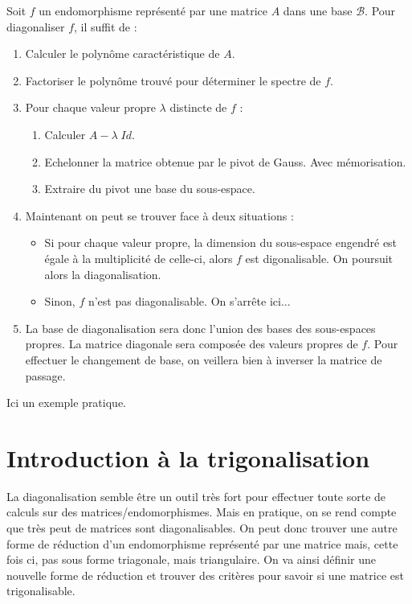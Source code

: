 Soit $f$ un endomorphisme représenté par une matrice $A$ dans une base $\mathcal{B}$. 
Pour diagonaliser $f$, il suffit de :
\begin{enumerate}
    \item Calculer le polynôme caractéristique de $A$. 
    \item Factoriser le polynôme trouvé pour déterminer le spectre de $f$. 
    \item Pour chaque valeur propre $\lambda$ distincte de $f$ :
        \begin{enumerate}
            \item Calculer $A - \lambda \; Id$. 
            \item Echelonner la matrice obtenue par le pivot de Gauss. Avec mémorisation. 
            \item Extraire du pivot une base du sous-espace. 
        \end{enumerate}
    \item Maintenant on peut se trouver face à deux situations :
        \begin{itemize}
            \item Si pour chaque valeur propre, la dimension du sous-espace engendré est égale à la multiplicité de 
                celle-ci, alors $f$ est digonalisable. On poursuit alors la diagonalisation. 
            \item Sinon, $f$ n'est pas diagonalisable. On s'arrête ici... 
        \end{itemize}
    \item La base de diagonalisation sera donc l'union des bases des sous-espaces propres. 
            La matrice diagonale sera composée des valeurs propres de $f$. 
            Pour effectuer le changement de base, on veillera bien à inverser la matrice de passage. 
\end{enumerate}

\begin{example}
    Ici un exemple pratique. 
\end{example}

\section{Introduction à la trigonalisation}

La diagonalisation semble être un outil très fort pour effectuer toute sorte de calculs sur des matrices/endomorphismes. 
Mais en pratique, on se rend compte que très peut de matrices sont diagonalisables. 
On peut donc trouver une autre forme de réduction d'un endomorphisme représenté par une matrice mais, cette fois ci, pas sous forme triagonale, 
mais triangulaire. On va ainsi définir une nouvelle forme de réduction et trouver des critères pour savoir si une matrice est trigonalisable. 

